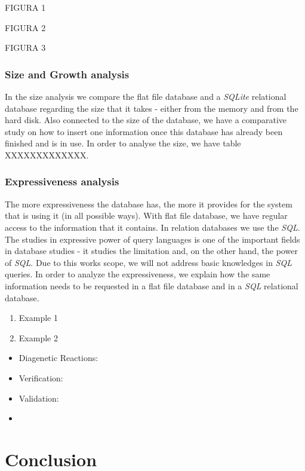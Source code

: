 \documentclass[ppgc,mestrado,English]{iiufrgs}
\begin{document}
FIGURA 1 

FIGURA 2

FIGURA 3

\subsection{Size and Growth analysis}
In the size analysis we compare the flat file database and a \emph{SQLite} relational database regarding the size that it takes - either from the memory and from the hard disk. Also connected to the size of the database, we have a comparative study on how to insert one information once this database has already been finished and is in use.
In order to analyse the size, we have table XXXXXXXXXXXXX.

\subsection{Expressiveness analysis}
The more expressiveness the database has, the more it provides for the system that is using it (in all possible ways). With flat file database, we have regular access to the information that it contains. In relation databases we use the \emph{SQL}. The studies in expressive power of query languages is one of the important fields in database studies - it studies the limitation and, on the other hand, the power of \emph{SQL}. Due to this works scope, we will not address basic knowledges in \emph{SQL} queries. 
In order to analyze the expressiveness, we explain how the same information needs to be requested in a flat file database and in a \emph{SQL} relational database. 

\begin{enumerate}
\item Example 1
\item Example 2
\end{enumerate}


\begin{itemize}
\item Diagenetic Reactions:
\item Verification: 
\item Validation: 
\item 
\end{itemize}



\chapter{Conclusion}
\end{document}
